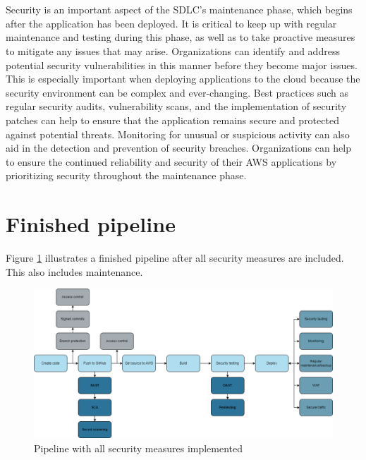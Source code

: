 \\~\\
Security is an important aspect of the SDLC's maintenance phase, which begins after the application has been deployed. It is critical to keep up with regular maintenance and testing during this phase, as well as to take proactive measures to mitigate any issues that may arise. Organizations can identify and address potential security vulnerabilities in this manner before they become major issues. This is especially important when deploying applications to the cloud because the security environment can be complex and ever-changing. Best practices such as regular security audits, vulnerability scans, and the implementation of security patches can help to ensure that the application remains secure and protected against potential threats. Monitoring for unusual or suspicious activity can also aid in the detection and prevention of security breaches. Organizations can help to ensure the continued reliability and security of their AWS applications by prioritizing security throughout the maintenance phase.

\section{Finished pipeline}
Figure \ref{fig: Pipeline with all security measures implemented} illustrates a finished pipeline after all security measures are included. This also includes maintenance.  

\vspace{2mm}
\begin{figure}[H]
    \centering
    \includegraphics[width=0.8\columnwidth]{Images/pipeline9.png}
    \caption{Pipeline with all security measures implemented}
    \label{fig: Pipeline with all security measures implemented}
\end{figure}



